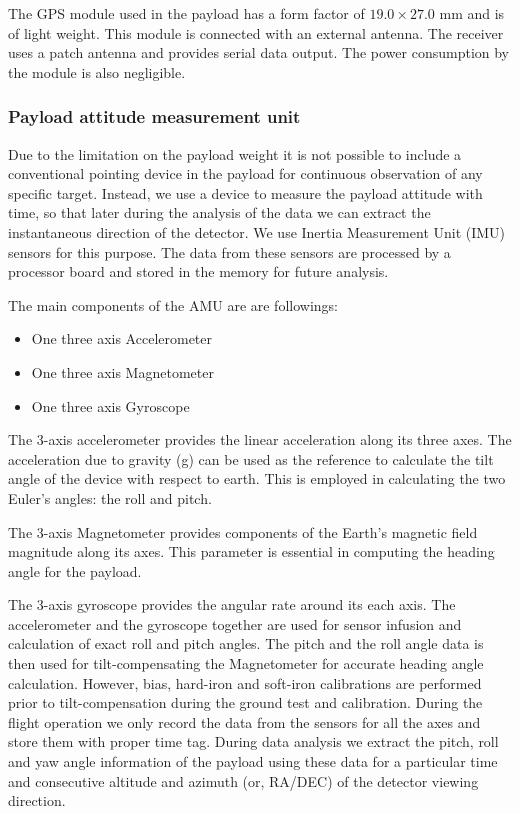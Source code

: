The GPS module used in the payload has a form factor of 
$19.0\times27.0$ mm and is of light weight. This module is connected with an 
external antenna. The receiver uses a patch antenna and provides serial data output.
The power consumption by the module is also negligible.

\subsubsection{Payload attitude measurement unit}
\label{sssec:dof}
Due to the limitation on the payload weight it is not possible to include a
conventional pointing device in the payload for continuous observation of any specific target.
Instead, we use a device to measure the payload attitude with time, so
that later during the analysis of the data we can extract the instantaneous
direction of the detector. We use Inertia Measurement Unit (IMU) sensors for this purpose.
The data from these sensors are processed by a processor board and stored in the
memory for future analysis.

The main components of the AMU are are followings:
\begin{itemize}
  \item One three axis Accelerometer
  \item One three axis Magnetometer
  \item One three axis Gyroscope
\end{itemize}

The 3-axis accelerometer provides the linear acceleration along its three axes.
The acceleration due to gravity (g) can be used as the reference to calculate
the tilt angle of the device with respect to earth. This is employed in
calculating the two Euler’s angles: the roll and pitch.

The 3-axis Magnetometer provides components of the Earth’s magnetic field
magnitude along its axes. This parameter is essential in computing the heading
angle for the payload.

The 3-axis gyroscope provides the angular rate around its each axis. The
accelerometer and the gyroscope together are used for sensor infusion and
calculation of exact roll and pitch angles. The pitch and the roll angle data is
then used for tilt-compensating the Magnetometer for accurate heading angle
calculation. However, bias, hard-iron and soft-iron calibrations are performed
prior to tilt-compensation during the ground test and calibration. During the
flight operation we only record the data from the sensors for all the axes
and store them with proper time tag. During data analysis we extract
the pitch, roll and yaw angle information of the payload using these data for a
particular time and consecutive altitude and azimuth (or, RA/DEC) of the
detector viewing direction.

